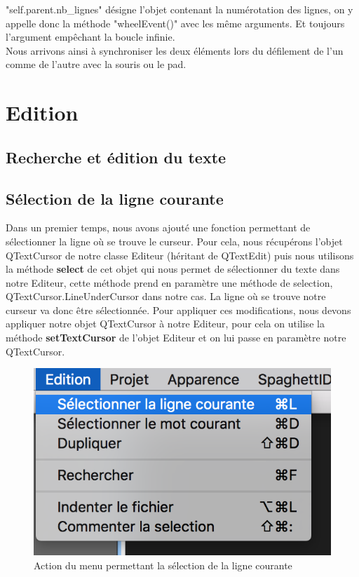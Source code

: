 \documentclass[a4paper,12pt]{article}
\begin{document}
		"self.parent.nb\_lignes" désigne l'objet contenant la numérotation des lignes, on y appelle donc la méthode "wheelEvent()" avec les même arguments. Et toujours l'argument empêchant la boucle infinie.\\
		
		Nous arrivons ainsi à synchroniser les deux éléments lors du défilement de l'un comme de l'autre avec la souris ou le pad.
		
\section{Edition}
		
	\subsection*{Recherche et édition du texte}

	\subsection{Sélection de la ligne courante}

	Dans un premier temps, nous avons ajouté une fonction permettant de sélectionner la ligne où se trouve le curseur.
	Pour cela, nous récupérons l'objet QTextCursor de notre classe Editeur (héritant de QTextEdit) puis nous utilisons la méthode \textbf{select} de cet objet qui nous permet de sélectionner du texte dans notre Editeur, cette méthode prend en paramètre une méthode de selection, QTextCursor.LineUnderCursor dans notre cas. La ligne où se trouve notre curseur va donc être sélectionnée.
	Pour appliquer ces modifications, nous devons appliquer notre objet QTextCursor à notre Editeur, pour cela on utilise la méthode \textbf{setTextCursor} de l'objet Editeur et on lui passe en paramètre notre QTextCursor.  


	\begin{figure}[h!]
		\begin{center}
			\includegraphics[scale=0.8]{images/imgs_edit/utilisation_selection_ligne}
			\caption{Action du menu permettant la sélection de la ligne courante}
		\end{center}
	\end{figure}
\end{document}
